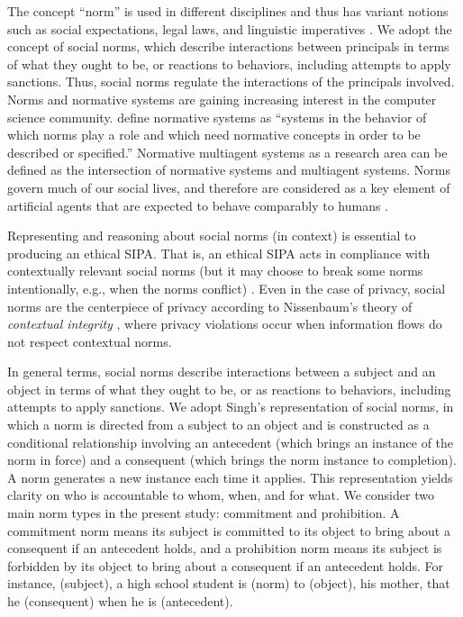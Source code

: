 The concept ``norm'' is used in different disciplines and thus has
variant notions such as social expectations, legal laws, and linguistic
imperatives \citep{Boella2009NormativeSystems}. We adopt the concept of
social norms, which describe interactions between principals in terms of
what they ought to be, or reactions to behaviors, including attempts to
apply sanctions. Thus, social norms regulate the interactions of the
principals involved. Norms and normative systems are gaining increasing
interest in the computer science community. \citet{Meyer+Wieringa-93}
define normative systems as ``systems in the behavior of which norms
play a role and which need normative concepts in order to be described
or specified.'' Normative multiagent systems as a research area can be
defined as the intersection of normative systems and multiagent systems.
Norms govern much of our social lives, and therefore are considered as a
key element of artificial agents that are expected to behave comparably
to humans \citep{boella2006normative}. 


Representing and reasoning about social norms (in context) is essential to producing an ethical SIPA. 
That is, an ethical SIPA acts in compliance with contextually relevant social norms (but it may choose to break some norms intentionally, e.g., when the norms conflict) \citep{Ajmeri-AAMAS17-Arnor}. 
Even in the case of privacy, social norms are the centerpiece of privacy according to Nissenbaum's theory of \emph{contextual integrity} \citep{Nissenbaum-04:integrity,Nissenbaum-11:online}, where privacy violations occur when information flows do not respect contextual norms.

In general terms, social norms describe interactions between a subject and an object in terms of what they ought to be, or as reactions to behaviors, including attempts to apply sanctions. 
We adopt Singh's  representation of social norms, in which a norm is directed from a subject to an object and is constructed as a conditional relationship involving an antecedent (which brings an instance of the norm in force) and a consequent (which brings the norm instance to completion). 
A norm generates a new instance each time it applies. 
This representation yields clarity on who is accountable to whom, when, and for what. 
We consider two main norm types in the present study: commitment and prohibition. 
A commitment norm means its subject is committed to its object to bring about a consequent if an antecedent holds, and a prohibition norm means its subject is forbidden by its object to bring about a consequent if an antecedent holds. 
For instance,  (subject), a high school student is  (norm) to  (object), his mother, that he  (consequent) when he is  (antecedent).

